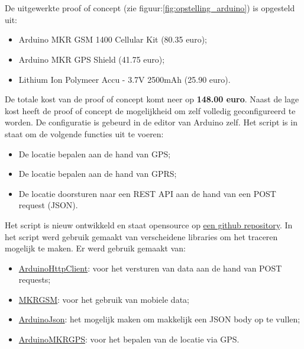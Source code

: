 \chapter{}
\label{ch:corpus}

\section{}
\label{ch:proof-of-concept}

\subsection{}
De uitgewerkte proof of concept (zie figuur:\ref{fig:opstelling_arduino}) is opgesteld uit:
\begin{itemize}
	\item Arduino MKR GSM 1400 Cellular Kit (80.35 euro);
	\item Arduino MKR GPS Shield (41.75 euro);
	\item Lithium Ion Polymeer Accu - 3.7V 2500mAh (25.90 euro).
\end{itemize}
De totale kost van de proof of concept komt neer op \textbf{148.00 euro}. Naast de lage kost heeft de proof of concept de mogelijkheid om zelf volledig geconfigureerd te worden. De configuratie is gebeurd in de editor van Arduino zelf. Het script is in staat om de volgende functies uit te voeren:
\begin{itemize}
	\item De locatie bepalen aan de hand van GPS;
	\item De locatie bepalen aan de hand van GPRS;
	\item De locatie doorsturen naar een REST API aan de hand van een POST request (JSON).
\end{itemize}
Het script is nieuw ontwikkeld en staat opensource op \href{https://github.com/IndyVC/bap-arduino}{een github repository}. In het script werd gebruik gemaakt van verscheidene libraries om het traceren mogelijk te maken.
Er werd gebruik gemaakt van:
\begin{itemize}
	\item \href{https://github.com/arduino-libraries/ArduinoHttpClient}{ArduinoHttpClient}: voor het versturen van data aan de hand van POST requests;
	\item \href{https://github.com/arduino-libraries/MKRGSM}{MKRGSM}: voor het gebruik van mobiele data;
	\item \href{https://github.com/bblanchon/ArduinoJson}{ArduinoJson}: het mogelijk maken om makkelijk een JSON body op te vullen;
	\item \href{https://github.com/arduino-libraries/Arduino_MKRGPS}{ArduinoMKRGPS}: voor het bepalen van de locatie via GPS.
\end{itemize}
